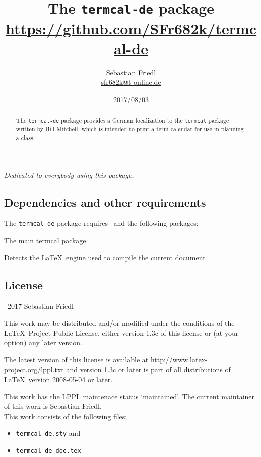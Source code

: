 \documentclass[11pt]{ltxdoc}
\title{The \texttt{termcal-de} package \\ {\large\url{https://github.com/SFr682k/termcal-de}}}
\author{Sebastian Friedl \\ \href{mailto:sfr682k@t-online.de}{\ttfamily sfr682k@t-online.de}}
\date{2017/08/03}
\begin{document}
	\maketitle
	\thispagestyle{empty}
	
	\begin{center} \itshape
		Dedicated to everybody using this package.
	\end{center}
	
	\medskip
	\begin{abstract}
		\hspace{-1.5em}%
		The \texttt{termcal-de} package provides a German localization to the \texttt{termcal} package written by Bill Mitchell, which is intended to print a term calendar for use in planning a class.
	\end{abstract}
	
	
	\tableofcontents
	
	\clearpage
	
	
	\subsection*{Dependencies and other requirements}
	The \texttt{termcal-de} package requires \LaTeXe\ and the following packages:
	
	\medskip
	The main termcal package
	
	\medskip
	Detects the \LaTeX\ engine used to compile the current document
	
	
	\subsection*{License}
	\begin{small}
		\textcopyright\ 2017 Sebastian Friedl
		
		\smallskip
		This work may be distributed and/or modified under the conditions of the \LaTeX\ Project Public License, either version 1.3c of this license or (at your option) any later version.
		
		\smallskip
		The latest version of this license is available at \url{http://www.latex-project.org/lppl.txt} and version 1.3c or later is part of all distributions of \LaTeX\ version 2008-05-04 or later.
		
		\smallskip
		This work has the LPPL maintenace status \enquote*{maintained}. The current maintainer of this work is Sebastian Friedl. \\
		This work consists of the following files:
		\begin{itemize} \itemsep 0pt
			\item \texttt{termcal-de.sty} and
			\item \texttt{termcal-de-doc.tex}
		\end{itemize}
	\end{small}
\end{document}
